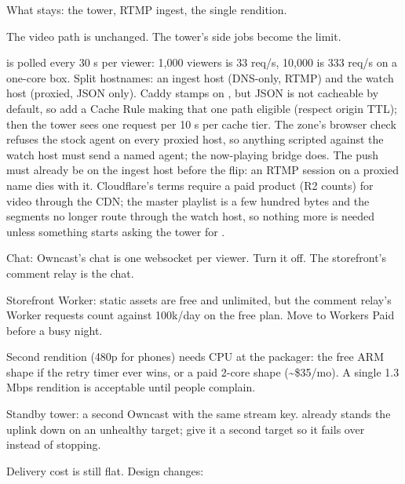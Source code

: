 \documentclass[fontpath=fonts/,logopath=logo/]{riposte-doc}
\begin{document}
What stays: the tower, RTMP ingest, the single rendition.


The video path is unchanged. The tower's side jobs become the limit.

\begin{ripbullets}
\item {} is polled every 30 s per viewer: 1,000 viewers is 33 req/s, 10,000 is 333 req/s on a one-core box. Split hostnames: an ingest host (DNS-only, RTMP) and the watch host (proxied, JSON only). Caddy stamps  on , but JSON is not cacheable by default, so add a Cache Rule making that one path eligible (respect origin TTL); then the tower sees one request per 10 s per cache tier. The zone's browser check refuses the stock  agent on every proxied host, so anything scripted against the watch host must send a named agent; the now-playing bridge does. The push must already be on the ingest host before the flip: an RTMP session on a proxied name dies with it. Cloudflare's terms require a paid product (R2 counts) for video through the CDN; the master playlist is a few hundred bytes and the segments no longer route through the watch host, so nothing more is needed unless something starts asking the tower for .
\item Chat: Owncast's chat is one websocket per viewer. Turn it off. The storefront's comment relay is the chat.
\item Storefront Worker: static assets are free and unlimited, but the comment relay's Worker requests count against 100k/day on the free plan. Move to Workers Paid before a busy night.
\item Second rendition (480p for phones) needs CPU at the packager: the free ARM shape if the retry timer ever wins, or a paid 2-core shape (\textasciitilde{}\$35/mo). A single 1.3 Mbps rendition is acceptable until people complain.
\item Standby tower: a second Owncast with the same stream key.  already stands the uplink down on an unhealthy target; give it a second target so it fails over instead of stopping.
\end{ripbullets}


Delivery cost is still flat. Design changes:
\end{document}
